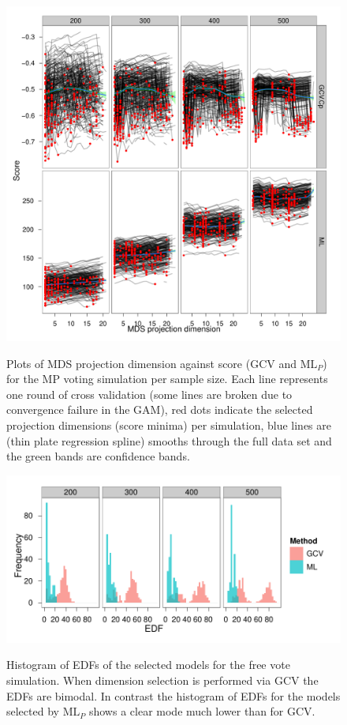 \begin{figure}
\centering
\includegraphics[width=6in]{gds/figs/mps-dimselect.pdf} \\
\caption{Plots of MDS projection dimension against score (GCV and $\text{ML}_P$) for the MP voting simulation per sample size. Each line represents one round of cross validation (some lines are broken due to convergence failure in the GAM), red dots indicate the selected projection dimensions (score minima) per simulation, blue lines are (thin plate regression spline) smooths through the full data set and the green bands are confidence bands.}
\label{gds-mps-dimselect}
\end{figure}

\begin{figure}
\centering
\includegraphics[width=6in]{gds/figs/mps-edf.pdf} \\
\caption{Histogram of EDFs of the selected models for the free vote simulation. When dimension selection is performed via GCV the EDFs are bimodal. In contrast the histogram of EDFs for the models selected by $\text{ML}_P$ shows a clear mode much lower than for GCV.}
\label{gds-mps-edf}
\end{figure}


